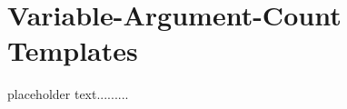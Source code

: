 \newpage
\section[Variadic Templates]{Variable-Argument-Count Templates}\label{variadictemplate}


placeholder text.........


